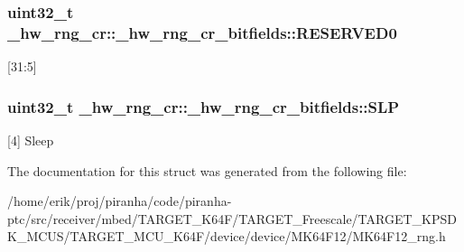 \subsubsection[{\texorpdfstring{R\+E\+S\+E\+R\+V\+E\+D0}{RESERVED0}}]{\setlength{\rightskip}{0pt plus 5cm}uint32\+\_\+t \+\_\+hw\+\_\+rng\+\_\+cr\+::\+\_\+hw\+\_\+rng\+\_\+cr\+\_\+bitfields\+::\+R\+E\+S\+E\+R\+V\+E\+D0}\hypertarget{struct__hw__rng__cr_1_1__hw__rng__cr__bitfields_a1c49317f7967bfe675907c248fd53ef5}{}\label{struct__hw__rng__cr_1_1__hw__rng__cr__bitfields_a1c49317f7967bfe675907c248fd53ef5}
\mbox{[}31\+:5\mbox{]} 
\subsubsection[{\texorpdfstring{S\+LP}{SLP}}]{\setlength{\rightskip}{0pt plus 5cm}uint32\+\_\+t \+\_\+hw\+\_\+rng\+\_\+cr\+::\+\_\+hw\+\_\+rng\+\_\+cr\+\_\+bitfields\+::\+S\+LP}\hypertarget{struct__hw__rng__cr_1_1__hw__rng__cr__bitfields_ae64e5912cea593c3573358bdc7013049}{}\label{struct__hw__rng__cr_1_1__hw__rng__cr__bitfields_ae64e5912cea593c3573358bdc7013049}
\mbox{[}4\mbox{]} Sleep 

The documentation for this struct was generated from the following file\+:\begin{DoxyCompactItemize}
\item 
/home/erik/proj/piranha/code/piranha-\/ptc/src/receiver/mbed/\+T\+A\+R\+G\+E\+T\+\_\+\+K64\+F/\+T\+A\+R\+G\+E\+T\+\_\+\+Freescale/\+T\+A\+R\+G\+E\+T\+\_\+\+K\+P\+S\+D\+K\+\_\+\+M\+C\+U\+S/\+T\+A\+R\+G\+E\+T\+\_\+\+M\+C\+U\+\_\+\+K64\+F/device/device/\+M\+K64\+F12/M\+K64\+F12\+\_\+rng.\+h\end{DoxyCompactItemize}
